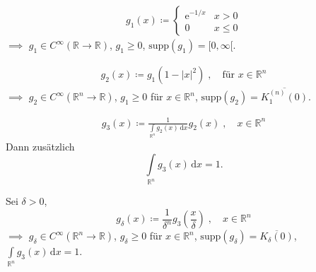 \begin{theorem}[Satz] \label{thm:10.4}
  \begin{enum-arab}
    \item
    \begin{align*}
      g_1(x) \coloneq
      \begin{cases}
        \mathrm{e}^{-1/x} & x > 0 \\
        0 & x \leq 0
      \end{cases}
    \end{align*}
    $\implies$ $g_1 \in C^\infty(\mathbb{R} \to \mathbb{R})$, $g_1 \geq 0$, $\mathrm{supp}(g_1) = [0,\infty[$.
    
    \item
    \begin{align*}
      g_2(x) \coloneq g_1(1-|x|^2) \; , \quad  \text{für $x \in \mathbb{R}^n$}
    \end{align*}
    $\implies$ $g_2 \in C^\infty(\mathbb{R}^n \to \mathbb{R})$, $g_1 \geq 0$ für $x \in \mathbb{R}^n$, $\mathrm{supp}(g_2) = \overline{K_1^{(n)}(0)}$.
    
    \item
    \begin{align*}
      g_3(x) \coloneq \frac{1}{\int\limits_{\mathbb{R}^n} g_2(x) \, \mathrm{d}x} g_2(x) \; , \quad x \in \mathbb{R}^n
    \end{align*}
    Dann zusätzlich \[ \int\limits_{\mathbb{R}^n} g_3(x) \, \mathrm{d}x = 1. \]
    
    \item Sei $\delta > 0$, \[ g_\delta(x) \coloneq \frac{1}{\delta^n} g_3\left( \frac{x}{\delta} \right) \; , \quad x \in \mathbb{R}^n \]
    $\implies$ $g_\delta \in C^\infty(\mathbb{R}^n \to \mathbb{R})$, $g_\delta \geq 0$ für $x \in \mathbb{R}^n$, $\mathrm{supp}(g_\delta) = \overline{K_\delta(0)}$, $\displaystyle \int\limits_{\mathbb{R}^n} g_3(x) \, \mathrm{d}x = 1$.
  \end{enum-arab}
\end{theorem}

